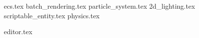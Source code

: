 \newpage


{ecs.tex}
\newpage
{batch_rendering.tex}
\newpage
{particle_system.tex}
\newpage
{2d_lighting.tex}
\newpage
{scriptable_entity.tex}
\newpage
{physics.tex}
\newpage

{editor.tex}
\newpage
